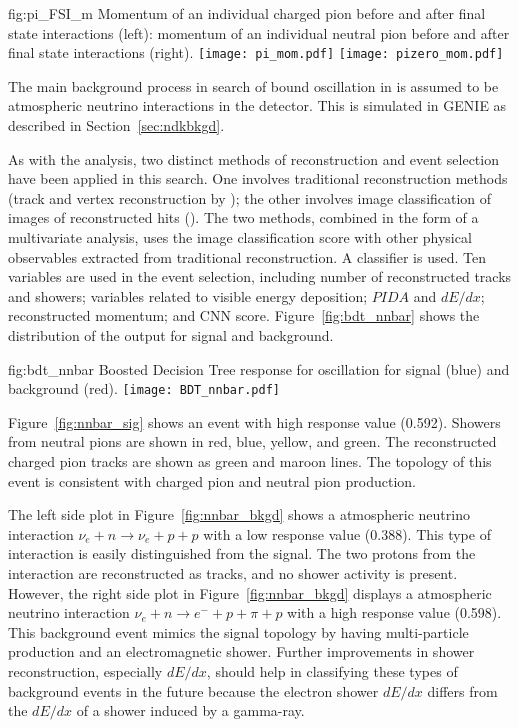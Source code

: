 \begin{dunefigure}
{fig:pi_FSI_m}
{Momentum of an individual charged pion before and after final state interactions (left): momentum of an individual neutral pion before and after final state interactions (right).}
\texttt{[image: pi\_mom.pdf]}
\texttt{[image: pizero\_mom.pdf]}
\end{dunefigure} 

The main background process in search of bound \nnbar oscillation in  is assumed to be atmospheric neutrino interactions in the detector.  This is simulated in GENIE as described in Section~\ref{sec:ndkbkgd}.

As with the \ptoknubar analysis, two distinct methods of reconstruction and event selection have been applied in this search. One involves traditional reconstruction methods (\threed track and vertex reconstruction by ); the other involves image classification 
of \twod images of reconstructed hits (). The two methods, combined in the form of a multivariate analysis, uses the image classification score with other physical observables extracted from traditional reconstruction.  A  classifier is used. Ten variables are used in the  event selection, including number of reconstructed tracks and showers; variables related to visible energy deposition; $PIDA$ and $dE/dx$; reconstructed momentum; and CNN score.  Figure~\ref{fig:bdt_nnbar} shows the distribution of the  output for signal and background.

\begin{dunefigure}
{fig:bdt_nnbar}
{Boosted Decision Tree response for \nnbar oscillation for signal (blue) and background (red).}
\texttt{[image: BDT\_nnbar.pdf]}
\end{dunefigure} 

Figure~\ref{fig:nnbar_sig} shows an \nnbar event with high  response value (\num{0.592}). Showers from neutral pions are shown in red, blue, yellow, and green. The reconstructed charged pion tracks are shown as green and maroon lines. The topology of this event is consistent with charged pion and neutral pion production. 

The left side plot in Figure~\ref{fig:nnbar_bkgd} shows a  atmospheric neutrino interaction $\nu_{e}+n\rightarrow \nu_{e}+p+p$ with a low  response value (\num{0.388}). This type of interaction is easily distinguished from the signal.  The two protons from the  interaction are reconstructed as tracks, and no shower activity is present. However, the right side plot in Figure~\ref{fig:nnbar_bkgd} displays a  atmospheric neutrino interaction $\nu_{e}+n\rightarrow {e}^{-}+p+\pi +p$ with a high  response value (\num{0.598}). This background event mimics the signal topology by having multi-particle production and an electromagnetic shower. Further improvements in shower reconstruction, especially $dE/dx$, should help in classifying these types of background events in the future because the electron shower $dE/dx$ differs from the $dE/dx$ of a shower induced by a gamma-ray.


